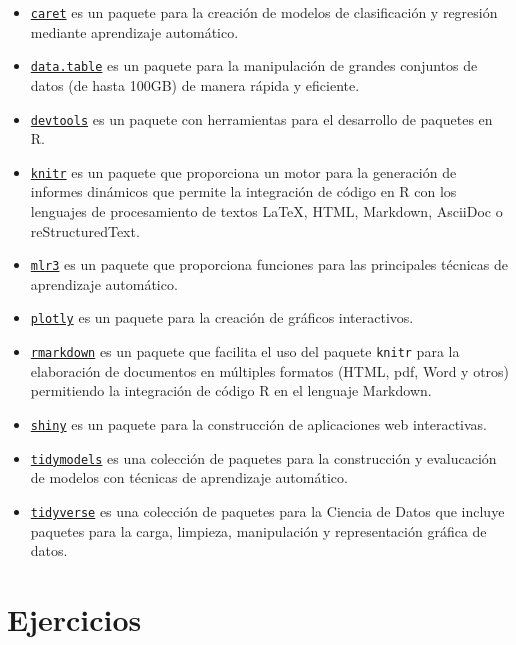 \documentclass[
  a4paper,
]{scrreport}
\providecommand{\tightlist}{%
  \setlength{\itemsep}{0pt}\setlength{\parskip}{0pt}}\usepackage{longtable,booktabs,array}
\theoremstyle{definition}
\theoremstyle{definition}
\theoremstyle{remark}
\begin{document}
\begin{itemize}
\tightlist
\item
  \href{https://topepo.github.io/caret/index.html}{\texttt{caret}} es un
  paquete para la creación de modelos de clasificación y regresión
  mediante aprendizaje automático.
\item
  \href{https://www.rdocumentation.org/packages/data.table/}{\texttt{data.table}}
  es un paquete para la manipulación de grandes conjuntos de datos (de
  hasta 100GB) de manera rápida y eficiente.
\item
  \href{https://www.rdocumentation.org/packages/devtools/}{\texttt{devtools}}
  es un paquete con herramientas para el desarrollo de paquetes en R.
\item
  \href{https://www.r-project.org/nosvn/pandoc/knitr.html}{\texttt{knitr}}
  es un paquete que proporciona un motor para la generación de informes
  dinámicos que permite la integración de código en R con los lenguajes
  de procesamiento de textos LaTeX, HTML, Markdown, AsciiDoc o
  reStructuredText.
\item
  \href{https://mlr3.mlr-org.com/}{\texttt{mlr3}} es un paquete que
  proporciona funciones para las principales técnicas de aprendizaje
  automático.
\item
  \href{https://plotly.com/r/}{\texttt{plotly}} es un paquete para la
  creación de gráficos interactivos.
\item
  \href{https://rmarkdown.rstudio.com/}{\texttt{rmarkdown}} es un
  paquete que facilita el uso del paquete \texttt{knitr} para la
  elaboración de documentos en múltiples formatos (HTML, pdf, Word y
  otros) permitiendo la integración de código R en el lenguaje Markdown.
\item
  \href{https://shiny.rstudio.com/}{\texttt{shiny}} es un paquete para
  la construcción de aplicaciones web interactivas.
\item
  \href{https://www.tidymodels.org/}{\texttt{tidymodels}} es una
  colección de paquetes para la construcción y evalucación de modelos
  con técnicas de aprendizaje automático.
\item
  \href{https://www.tidyverse.org/}{\texttt{tidyverse}} es una colección
  de paquetes para la Ciencia de Datos que incluye paquetes para la
  carga, limpieza, manipulación y representación gráfica de datos.
\end{itemize}

\section{Ejercicios}\label{ejercicios-3}
\end{document}
